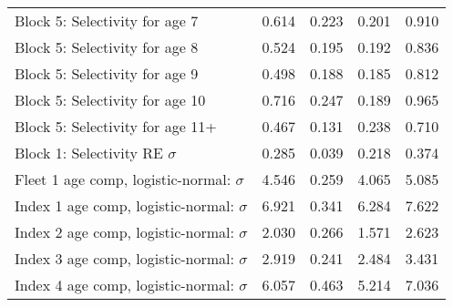 \documentclass[
]{article}
\begin{document}
\begin{landscape}
\begin{longtable}[t]{lrrrr}
\addlinespace
Block 5: Selectivity for age 7 & 0.614 & 0.223 & 0.201 & 0.910\\
Block 5: Selectivity for age 8 & 0.524 & 0.195 & 0.192 & 0.836\\
Block 5: Selectivity for age 9 & 0.498 & 0.188 & 0.185 & 0.812\\
Block 5: Selectivity for age 10 & 0.716 & 0.247 & 0.189 & 0.965\\
Block 5: Selectivity for age 11+ & 0.467 & 0.131 & 0.238 & 0.710\\
\addlinespace
Block 1: Selectivity RE $\sigma$ & 0.285 & 0.039 & 0.218 & 0.374\\
Fleet 1 age comp, logistic-normal: $\sigma$ & 4.546 & 0.259 & 4.065 & 5.085\\
Index 1 age comp, logistic-normal: $\sigma$ & 6.921 & 0.341 & 6.284 & 7.622\\
Index 2 age comp, logistic-normal: $\sigma$ & 2.030 & 0.266 & 1.571 & 2.623\\
Index 3 age comp, logistic-normal: $\sigma$ & 2.919 & 0.241 & 2.484 & 3.431\\
\addlinespace
Index 4 age comp, logistic-normal: $\sigma$ & 6.057 & 0.463 & 5.214 & 7.036\\*
\end{longtable}
\end{landscape}
\end{document}
